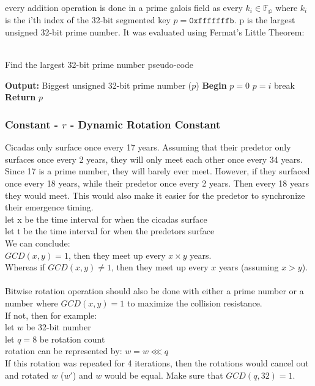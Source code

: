 \documentclass[fleqn, a4paper,12pt]{article}
\begin{document}
every addition operation is done in a prime galois field as every $k_i \in \mathbb{F_p}$ where $k_i$ is the i'th index of the 32-bit segmented key $p = \texttt{0xfffffffb}$. p is the largest unsigned 32-bit prime number. It was evaluated using Fermat's Little Theorem:\\
\\
\begin{algorithm}[H] %
\caption{Find the largest 32-bit prime number pseudo-code}
\begin{algorithmic}[1]  %
\State \textbf{Output:} Biggest unsigned 32-bit prime number ($p$)
\State \textbf{Begin}
\State $p = 0$
		\State $p = i$
		\State break
	\EndIf
\EndFor
\State \textbf{Return} $p$
\end{algorithmic}
\end{algorithm}

\subsubsection{Constant - $r$ - Dynamic Rotation Constant} \label{rotation_constant}

Cicadas only surface once every 17 years. Assuming that their predetor only surfaces once every 2 years, they will only meet each other once every 34 years. Since 17 is a prime number, they will barely ever meet. However, if they surfaced once every 18 years, while their predetor once every 2 years. Then every 18 years they would meet. This would also make it easier for the predetor to synchronize their emergence timing.\\
let x be the time interval for when the cicadas surface \\
let t be the time interval for when the predetors surface \\
We can conclude:\\
$GCD(x,y) = 1$, then they meet up every $x \times y$ years. \\
Whereas if $GCD(x,y) \neq 1$, then they meet up every $x$ years (assuming $x > y$). \\
\\
Bitwise rotation operation should also be done with either a prime number or a number where $GCD(x,y) = 1$ to maximize the collision resistance.\\

If not, then for example: \\
let $w$ be 32-bit number\\
let $q = 8$ be rotation count\\
rotation can be represented by: $w = w \lll q$\\
If this rotation was repeated for 4 iterations, then the rotations would cancel out and rotated $w$ ($w'$) and $w$ would be equal. Make sure that $GCD(q, 32) = 1$. \\
\end{document}
